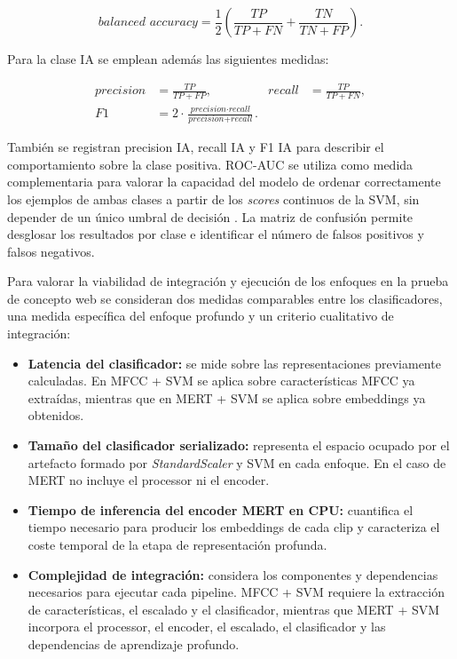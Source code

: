 \[
    \textit{balanced accuracy} = \frac{1}{2}\left(\frac{TP}{TP + FN} + \frac{TN}{TN + FP}\right).
\]

Para la clase IA se emplean además las siguientes medidas:

\begin{align*}
    \textit{precision} &= \frac{TP}{TP + FP},
    & \textit{recall} &= \frac{TP}{TP + FN}, \\
    F1 &= 2 \cdot \frac{\textit{precision} \cdot \textit{recall}}{\textit{precision} + \textit{recall}}.
\end{align*}

También se registran precision IA, recall IA y F1 IA para describir el comportamiento sobre la clase positiva. ROC-AUC se utiliza como medida complementaria para valorar la capacidad del modelo de ordenar correctamente los ejemplos de ambas clases a partir de los \textit{scores} continuos de la SVM, sin depender de un único umbral de decisión \cite{fawcett2006roc}. La matriz de confusión permite desglosar los resultados por clase e identificar el número de falsos positivos y falsos negativos.

Para valorar la viabilidad de integración y ejecución de los enfoques en la prueba de concepto web se consideran dos medidas comparables entre los clasificadores, una medida específica del enfoque profundo y un criterio cualitativo de integración:
\begin{itemize}
    \item \textbf{Latencia del clasificador:} se mide sobre las representaciones previamente calculadas. En MFCC + SVM se aplica sobre características MFCC ya extraídas, mientras que en MERT + SVM se aplica sobre embeddings ya obtenidos.
    \item \textbf{Tamaño del clasificador serializado:} representa el espacio ocupado por el artefacto formado por \textit{StandardScaler} y SVM en cada enfoque. En el caso de MERT no incluye el processor ni el encoder.
    \item \textbf{Tiempo de inferencia del encoder MERT en CPU:} cuantifica el tiempo necesario para producir los embeddings de cada clip y caracteriza el coste temporal de la etapa de representación profunda.
    \item \textbf{Complejidad de integración:} considera los componentes y dependencias necesarios para ejecutar cada pipeline. MFCC + SVM requiere la extracción de características, el escalado y el clasificador, mientras que MERT + SVM incorpora el processor, el encoder, el escalado, el clasificador y las dependencias de aprendizaje profundo.
\end{itemize}

